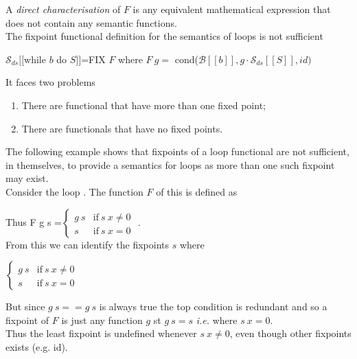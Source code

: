 \documentclass[11pt,a4paper]{article}
\begin{document}
A \textit{direct characterisation} of $F$ is any equivalent mathematical expression that does not contain any semantic functions.\\

The fixpoint functional definition for the semantics of loops is not sufficient
\begin{center}
$\mathcal{S}_{ds}[[$while $b$ do $S]]$=FIX $F$ where $F\ g=$ cond($\mathcal{B}[[b]],g\cdot\mathcal{S}_{ds}[[S]],id)$
\end{center}
It faces two problems
\begin{enumerate}[label=\roman*)]
	\item There are functional that have more than one fixed point;
	\item There are functionals that have no fixed points.\\
\end{enumerate}

The following example shows that fixpoints of a loop functional are not sufficient, in themselves, to provide a semantics for loops as more than one such fixpoint may exist.\\
Consider the loop {}. The function $F$ of this is defined as
\begin{center}
{}
\end{center}
Thus {\ttfamily F g s =}$\begin{cases}g\ s&\mathrm{if\ }s\ x\neq0\\s&\mathrm{if\ }s\ x=0\end{cases}$
.\\
From this we can identify the fixpoints $s$ where
\begin{center}
{}$\begin{cases}g\ s&\mathrm{if\ }s\ x\neq0\\s&\mathrm{if\ }s\ x=0\end{cases}$
\end{center}
But since $g\ s==g\ s$ is always true the top condition is redundant and so a fixpoint of $F$ is just any function $g$ st $g\ s=s$ \textit{i.e.} where $s\ x=0$.\\
Thus the least fixpoint is undefined whenever $s\ x\neq 0$, even though other fixpoints exists (e.g. id).\\
\end{document}
